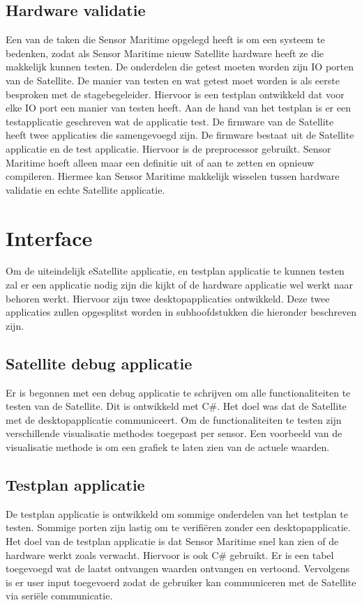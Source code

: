 \subsection{Hardware validatie}
Een van de taken die Sensor Maritime opgelegd heeft is om een systeem te bedenken, zodat als Sensor Maritime nieuw Satellite hardware heeft ze die makkelijk kunnen testen. De onderdelen die getest moeten worden zijn IO porten van de Satellite. De manier van testen en wat getest moet worden is als eerste besproken met de stagebegeleider. Hiervoor is een testplan ontwikkeld dat voor elke IO port een manier van testen heeft. Aan de hand van het testplan is er een testapplicatie geschreven wat de applicatie test. De firmware van de Satellite heeft twee applicaties die samengevoegd zijn. De firmware bestaat uit de Satellite applicatie en de test applicatie. Hiervoor is de preprocessor gebruikt. Sensor Maritime hoeft alleen maar een definitie uit of aan te zetten en opnieuw compileren. Hiermee kan Sensor Maritime makkelijk wisselen tussen hardware validatie en echte Satellite applicatie.

\section{Interface}
Om de uiteindelijk eSatellite applicatie, en testplan applicatie te kunnen testen zal er een applicatie nodig zijn die kijkt of de hardware applicatie wel werkt naar behoren werkt. Hiervoor zijn twee desktopapplicaties ontwikkeld. Deze twee applicaties zullen opgesplitst worden in subhoofdstukken die hieronder beschreven zijn.

\subsection{Satellite debug applicatie}
Er is begonnen met een debug applicatie te schrijven om alle functionaliteiten te testen van de Satellite. Dit is ontwikkeld met C\#. Het doel was dat de Satellite met de desktopapplicatie communiceert. Om de functionaliteiten te testen zijn verschillende visualisatie methodes toegepast per sensor. Een voorbeeld van de visualisatie methode is om een grafiek te laten zien van de actuele waarden. 

\subsection{Testplan applicatie}
De testplan applicatie is ontwikkeld om sommige onderdelen van het testplan te testen. Sommige porten zijn lastig om te verifiëren zonder een desktopapplicatie. Het doel van de testplan applicatie is dat Sensor Maritime snel kan zien of de hardware werkt zoals verwacht. Hiervoor is ook C\# gebruikt. Er is een tabel toegevoegd wat de laatst ontvangen waarden ontvangen en vertoond. Vervolgens is er user input toegevoerd zodat de gebruiker kan communiceren met de Satellite via seriële communicatie.

